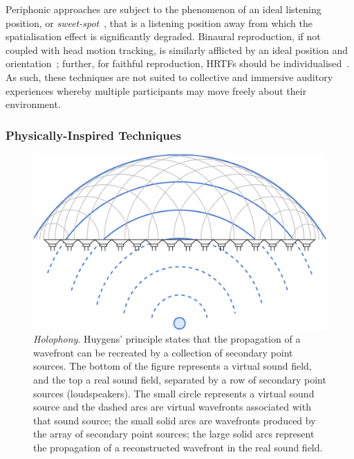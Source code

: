 
Periphonic approaches are subject to the phenomenon of an ideal listening
position, or \textit{sweet-spot}~\citep{nicol_sound_2017}, that is a listening
position away from which the spatialisation effect is significantly degraded.
Binaural reproduction, if not coupled with head motion tracking, is similarly
afflicted by an ideal position and orientation~\citep{verheijen_sound_1998};
further, for faithful reproduction, HRTFs should be
individualised~\citep{de_poli_physically_1998}.
As such, these techniques are not suited to collective and immersive auditory
experiences whereby multiple participants may move freely about their
environment.



\subsubsection{Physically-Inspired Techniques}\label{subsubsec:sound-field-synthesis}

\begin{figure}[ht]
    \centering
    \includegraphics[width=.75\textwidth]{figures/wfs_1}
    \caption{\textit{Holophony}.
    Huygens' principle states that the propagation of a wavefront
    can be recreated by a collection of secondary point sources.
    The bottom of the figure represents a virtual sound field, and the top a
    real sound field, separated by a row of secondary point sources
        (loudspeakers).
        The small circle represents a virtual sound source and the dashed arcs
        are virtual wavefronts associated with that sound source;
        the small solid arcs are wavefronts produced by the array of secondary
        point sources;
        the large solid arcs represent the propagation of a reconstructed
        wavefront in the real sound field.}
    \label{fig:wfs_1}
\end{figure}

